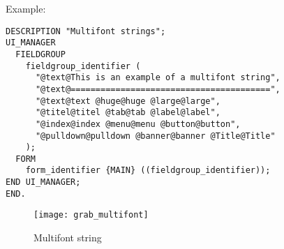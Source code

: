 \newpage
\label{sec:multifontexamples}

Example:


\begin{boxedminipage}[t]{\linewidth}
\begin{verbatim}
DESCRIPTION "Multifont strings";
UI_MANAGER
  FIELDGROUP
    fieldgroup_identifier (
      "@text@This is an example of a multifont string",
      "@text@========================================",
      "@text@text @huge@huge @large@large",
      "@titel@titel @tab@tab @label@label",
      "@index@index @menu@menu @button@button",
      "@pulldown@pulldown @banner@banner @Title@Title"
    );
  FORM
    form_identifier {MAIN} ((fieldgroup_identifier));
END UI_MANAGER;
END.
\end{verbatim}
\end{boxedminipage}

\vspace{0.5cm}

\begin{figure}[h]\label{fig:multifontString}
  \begin{center}
    \texttt{[image: grab\_multifont]}
  \end{center}
  \caption{Multifont string}
\end{figure}
